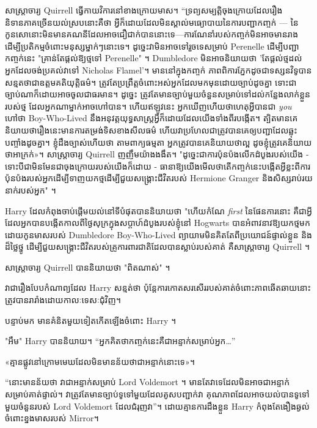សាស្ត្រាចារ្យ Quirrell ធ្វើកាយវិការនៅខាងក្រោយមាស។ “ទ្រព្យសម្បត្តិចុងក្រោយដែលរឿងនិទានភាគច្រើនយល់ស្របនោះគឺថា អ្វីក៏ដោយដែលមិនស្គាល់មធ្យោបាយនៃការបញ្ជាកញ្ចក់ — នៃកូនសោនោះមិនមានគណនីដែលអាចជឿជាក់បាននោះទេ—ការណែនាំរបស់កញ្ចក់មិនអាចមានរាងដើម្បីប្រតិកម្មចំពោះមនុស្សម្នាក់ៗនោះទេ។ ដូច្នេះវាមិនអាចទៅរួចទេសម្រាប់ Perenelle ដើម្បីបញ្ជាកញ្ចក់នេះ "គ្រាន់តែផ្តល់ឱ្យថ្មទៅ Perenelle" ។ Dumbledore មិន​អាច​និយាយ​ថា 'តែ​ផ្តល់​ថ្ម​ដល់​អ្នក​ដែល​ចង់​ប្រគល់​វា​ទៅ Nicholas Flamel'។ មាននៅក្នុងកញ្ចក់ ភាពពិការភ្នែកដូចជាទស្សនវិទូបានសន្មតថាជាឧត្តមគតិយុត្តិធម៌។ ត្រូវតែប្រព្រឹត្តចំពោះអស់អ្នកដែលមកមុនដោយច្បាប់ដូចគ្នា ទោះជាច្បាប់ណាក៏ដោយអាចចូលជាធរមាន។ ដូច្នេះ ត្រូវតែមានច្បាប់មួយចំនួនសម្រាប់ទៅដល់កន្លែងលាក់ខ្លួនរបស់ថ្ម ដែលអ្នកណាម្នាក់អាចហៅបាន។ ហើយឥឡូវនេះ អ្នកឃើញហើយថាហេតុអ្វីបានជា \emph{you} ហៅថា Boy-Who-Lived នឹងអនុវត្តយុទ្ធសាស្រ្តអ្វីក៏ដោយដែលយើងទាំងពីរបង្កើត។ ត្បិត​មាន​គេ​និយាយ​ថា​រឿង​នេះ​មាន​ការ​តម្រង់​ទិស​ខាង​សីលធម៌ ហើយ​វា​ប្រហែល​ជា​ត្រូវ​បាន​គេ​ឲ្យ​បញ្ជា​ដែល​ឆ្លុះ​បញ្ចាំង​ដូច​គ្នា។ ខ្ញុំ​ដឹង​ច្បាស់​ហើយ​ថា តាម​ពាក្យ​ធម្មតា អ្នក​ត្រូវ​បាន​គេ​និយាយ​ថា​ល្អ ដូច​ខ្ញុំ​ត្រូវ​គេ​និយាយ​ថា​អាក្រក់»។ សាស្រ្តាចារ្យ Quirrell ញញឹមយ៉ាងងងឹត។ "ដូច្នេះជាការប៉ុនប៉ងលើកដំបូងរបស់យើង - ទោះបីជាមិនមែនជាចុងក្រោយរបស់យើងក៏ដោយ - ធានាឱ្យយើងមើលថាតើកញ្ចក់នេះបង្កើតអ្វីខ្លះពីការប៉ុនប៉ងរបស់អ្នកដើម្បីទាញយកថ្មដើម្បីជួយសង្គ្រោះជីវិតរបស់ Hermione Granger និងសិស្សរាប់រយនាក់របស់អ្នក" ។

Harry ដែលកំពុងចាប់ផ្តើមយល់នៅទីបំផុតបាននិយាយថា "ហើយកំណែ \emph{first} នៃផែនការនោះ គឺជាអ្វីដែលអ្នកបានបង្កើតកាលពីថ្ងៃសុក្រក្នុងសប្តាហ៍ដំបូងរបស់ខ្ញុំនៅ Hogwarts បានអំពាវនាវឱ្យយកថ្មមកដោយកូនមាសរបស់ Dumbledore Boy-Who-Lived ព្យាយាមមិនគិតតែពីប្រយោជន៍ផ្ទាល់ខ្លួន និងដ៏ថ្លៃថ្នូ ដើម្បីជួយសង្រ្គោះជីវិតរបស់គ្រូការពារជាតិដែលបានស្លាប់របស់គាត់ គឺសាស្រ្តាចារ្យ Quirrell ។

សាស្រ្តាចារ្យ Quirrell បាននិយាយថា "ពិតណាស់" ។

វាជារឿងបែបកំណាព្យដែល Harry សន្មត់ថា ប៉ុន្តែការកោតសរសើររបស់គាត់ចំពោះភាពឆើតឆាយនោះត្រូវបានរារាំងដោយកាលៈទេសៈជុំវិញ។

បន្ទាប់មក មានគំនិតមួយទៀតកើតឡើងចំពោះ Harry ។

"អឹម" Harry បាននិយាយ។ “អ្នកគិតថាកញ្ចក់នេះគឺជាអន្ទាក់សម្រាប់អ្នក…”

«​គ្មាន​ផ្លូវ​នៅ​ក្រោម​មេឃ​ដែល​មិន​មាន​ន័យ​ថា​ជា​អន្ទាក់​នោះ​ទេ​»។

“នោះមានន័យថា វាជាអន្ទាក់សម្រាប់ Lord Voldemort ។ មានតែវាទេដែលមិនអាចជាអន្ទាក់សម្រាប់គាត់ផ្ទាល់។ វាត្រូវតែមានច្បាប់ទូទៅមួយដែលគូសបញ្ជាក់វា គុណភាពដែលអាចយល់បានទូទៅមួយចំនួនរបស់ Lord Voldemort ដែលជំរុញវា”។ ដោយ​គ្មាន​ការ​ដឹង​ខ្លួន Harry កំពុង​តែ​ងឿង​ឆ្ងល់​ចំពោះ​ខ្នង​មាស​របស់ Mirror។

